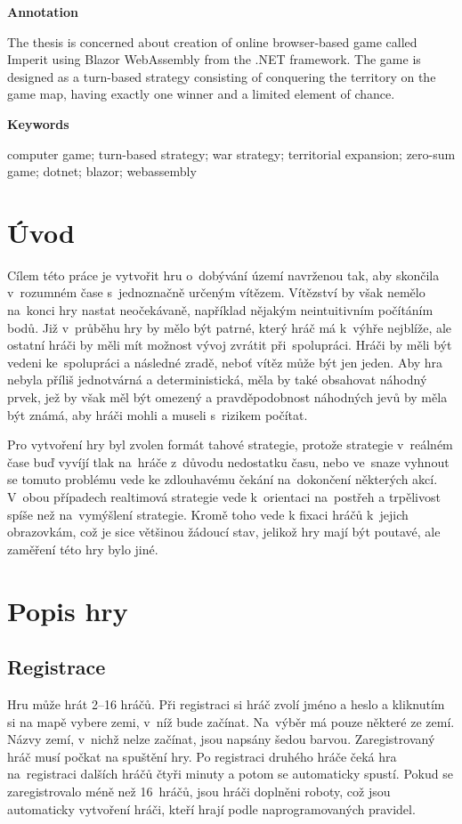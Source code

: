 \documentclass[a4paper,12pt]{article}
\begin{document}
\Large\textbf{Annotation}\normalsize

The thesis is concerned about creation of online browser-based game called Imperit using Blazor WebAssembly from the .NET framework. The game is designed as a turn-based strategy consisting of conquering the territory on the game map, having exactly one winner and a limited element of chance.

\Large\textbf{Keywords}\normalsize

computer game; turn-based strategy; war strategy; territorial expansion; zero-sum game;\- dotnet; blazor; webassembly
\newpage
\thispagestyle{empty}
\tableofcontents
\newpage
\section{Úvod}
Cílem této práce je vytvořit hru o~dobývání území navrženou tak, aby skončila v~rozumném čase s~jednoznačně určeným vítězem. Vítězství by však nemělo na~konci hry nastat neočekávaně, například nějakým neintuitivním počítáním bodů. Již v~průběhu hry by mělo být patrné, který hráč má k~výhře nejblíže, ale ostatní hráči by měli mít možnost vývoj zvrátit při~spolupráci. Hráči by měli být vedeni ke~spolupráci a následné zradě, neboť vítěz může být jen jeden. Aby hra nebyla příliš jednotvárná a deterministická, měla by také obsahovat náhodný prvek, jež by však měl být omezený a pravděpodobnost náhodných jevů by měla být známá, aby hráči mohli a museli s~rizikem počítat.

Pro vytvoření hry byl zvolen formát tahové strategie, protože strategie v~reálném čase buď vyvíjí tlak na~hráče z~důvodu nedostatku času, nebo ve~snaze vyhnout se tomuto problému vede ke zdlouhavému čekání na~dokončení některých akcí. \cite{turnreal1} V~obou případech realtimová strategie vede k~orientaci na~postřeh a trpělivost spíše než na~vymýšlení strategie. \cite{turnreal2} Kromě toho vede k fixaci hráčů k~jejich obrazovkám, což je sice většinou žádoucí stav, jelikož hry mají být poutavé, ale zaměření této hry bylo jiné.

\section{Popis hry}
\subsection{Registrace}
Hru může hrát 2--16 hráčů. Při registraci si hráč zvolí jméno a heslo a kliknutím si na mapě vybere zemi, v~níž bude začínat. Na~výběr má pouze některé ze zemí. Názvy zemí, v~nichž nelze začínat, jsou napsány šedou barvou. Zaregistrovaný hráč musí počkat na spuštění hry. Po registraci druhého hráče čeká hra na~registraci dalších hráčů čtyři minuty a potom se automaticky spustí. Pokud se zaregistrovalo méně než 16~hráčů, jsou hráči doplněni roboty, což jsou automaticky vytvoření hráči, kteří hrají podle naprogramovaných pravidel.
\end{document}
